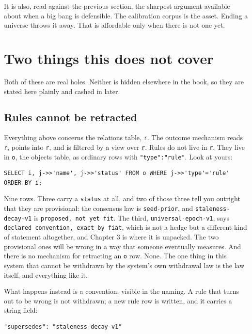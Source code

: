 It is also, read against the previous section, the sharpest argument available about when a big bang is defensible. The calibration corpus is the asset. Ending a universe throws it away. That is affordable only when there is not one yet.

\section{Two things this does not cover}

Both of these are real holes. Neither is hidden elsewhere in the book, so they are stated here plainly and cashed in later.

\subsection*{Rules cannot be retracted}

Everything above concerns the relations table, \texttt{r}. The outcome mechanism reads \texttt{r}, points into \texttt{r}, and is filtered by a view over \texttt{r}. Rules do not live in \texttt{r}. They live in \texttt{o}, the objects table, as ordinary rows with \texttt{"type":"rule"}. Look at yours:

\begin{verbatim}
SELECT i, j->>'name', j->>'status' FROM o WHERE j->>'type'='rule' ORDER BY i;
\end{verbatim}

Nine rows. Three carry a \texttt{status} at all, and two of those three tell you outright that they are provisional: the consensus law is \texttt{seed-prior}, and \texttt{staleness-decay-v1} is \texttt{proposed, not yet fit}. The third, \texttt{universal-epoch-v1}, says \texttt{declared convention, exact by fiat}, which is not a hedge but a different kind of statement altogether, and Chapter 3 is where it is unpacked. The two provisional ones will be wrong in a way that someone eventually measures. And there is no mechanism for retracting an \texttt{o} row. None. The one thing in this system that cannot be withdrawn by the system's own withdrawal law is the law itself, and everything like it.

What happens instead is a convention, visible in the naming. A rule that turns out to be wrong is not withdrawn; a new rule row is written, and it carries a string field:

\begin{verbatim}
"supersedes": "staleness-decay-v1"
\end{verbatim}


